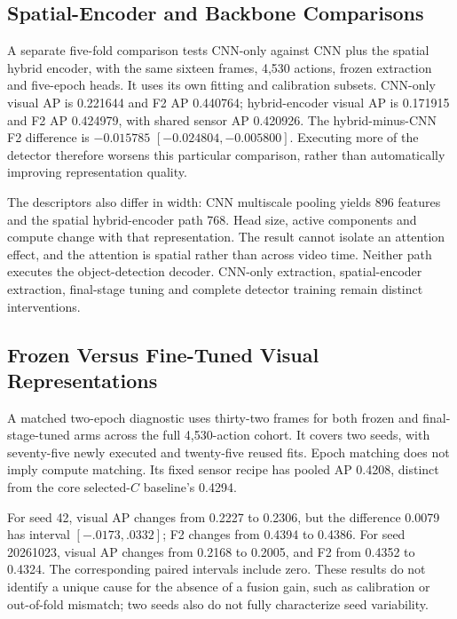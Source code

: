 \subsection{Spatial-Encoder and Backbone Comparisons}
A separate five-fold comparison tests CNN-only against CNN plus the spatial hybrid encoder, with the same sixteen frames, 4,530 actions, frozen extraction and five-epoch heads. It uses its own fitting and calibration subsets. CNN-only visual AP is 0.221644 and F2 AP 0.440764; hybrid-encoder visual AP is 0.171915 and F2 AP 0.424979, with shared sensor AP 0.420926. The hybrid-minus-CNN F2 difference is $-0.015785$ $[-0.024804,-0.005800]$. Executing more of the detector therefore worsens this particular comparison, rather than automatically improving representation quality.

The descriptors also differ in width: CNN multiscale pooling yields 896 features and the spatial hybrid-encoder path 768. Head size, active components and compute change with that representation. The result cannot isolate an attention effect, and the attention is spatial rather than across video time. Neither path executes the object-detection decoder. CNN-only extraction, spatial-encoder extraction, final-stage tuning and complete detector training remain distinct interventions.

\subsection{Frozen Versus Fine-Tuned Visual Representations}
A matched two-epoch diagnostic uses thirty-two frames for both frozen and final-stage-tuned arms across the full 4,530-action cohort. It covers two seeds, with seventy-five newly executed and twenty-five reused fits. Epoch matching does not imply compute matching. Its fixed sensor recipe has pooled AP 0.4208, distinct from the core selected-$C$ baseline's 0.4294.

For seed 42, visual AP changes from 0.2227 to 0.2306, but the difference 0.0079 has interval $[-.0173,.0332]$; F2 changes from 0.4394 to 0.4386. For seed 20261023, visual AP changes from 0.2168 to 0.2005, and F2 from 0.4352 to 0.4324. The corresponding paired intervals include zero. These results do not identify a unique cause for the absence of a fusion gain, such as calibration or out-of-fold mismatch; two seeds also do not fully characterize seed variability.

